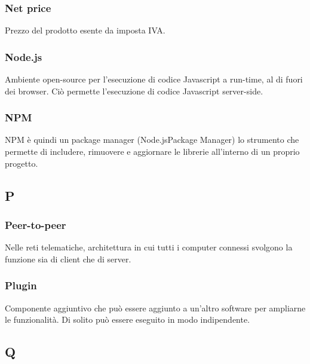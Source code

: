 \subsubsection*{Net price}
Prezzo del prodotto esente da imposta IVA.


\subsubsection*{Node.js}
Ambiente open-source per l'esecuzione di codice Javascript a run-time, al di fuori dei browser. Ciò permette l'esecuzione di codice Javascript server-side.

\subsubsection*{NPM}
NPM è quindi un package manager (Node.js\glosp Package Manager) lo strumento che permette di includere, rimuovere e aggiornare le librerie all'interno di un proprio progetto.


\subsection*{P}


\subsubsection*{Peer-to-peer}
Nelle reti telematiche, architettura in cui tutti i computer connessi svolgono la funzione sia di client che di server.

\subsubsection*{Plugin}
Componente aggiuntivo che può essere aggiunto a un'altro software per ampliarne le funzionalità. Di solito può essere eseguito in modo indipendente.



\subsection*{Q}

